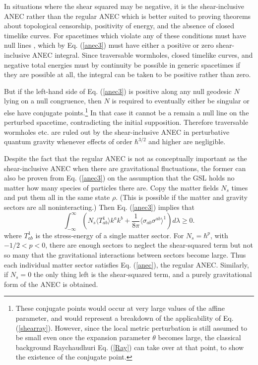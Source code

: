 \documentclass{article}
\begin{document}
In situations where the shear squared may be negative, it is the shear-inclusive ANEC rather than the regular ANEC which is better suited to proving theorems about topological censorship, positivity of energy, and the absence of closed timelike curves.  For spacetimes which violate any of these conditions must have null lines \cite{GO07}\cite{PSW93}, which by Eq. (\ref{anec3}) must have either a positive or zero shear-inclusive ANEC integral.  Since traversable wormholes, closed timelike curves, and negative total energies must by continuity be possible in generic spacetimes if they are possible at all, the integral can be taken to be positive rather than zero.

But if the left-hand side of Eq. (\ref{anec3}) is positive along any null geodesic $N$ lying on a null congruence, then $N$ is required to eventually either be singular or else have conjugate points.\footnote{These conjugate points would occur at very large values of the affine parameter, and would represent a breakdown of the applicability of Eq. (\ref{shearray}).  However, since the local metric perturbation is still assumed to be small even once the expansion parameter $\theta$ becomes large, the classical background Raychaudhuri Eq. (\ref{Ray}) can take over at that point, to show the existence of the conjugate point.}  In that case it cannot be a remain a null line on the perturbed spacetime, contradicting the initial supposition.  Therefore traversable wormholes etc. are ruled out by the shear-inclusive ANEC in perturbative quantum gravity whenever effects of order $\hbar^{3/2}$ and higher are negligible.

Despite the fact that the regular ANEC is not as conceptually important as the shear-inclusive ANEC when there are gravitational fluctuations, the former can also be proven from Eq. (\ref{anec3}) on the assumption that the GSL holds no matter how many species of particles there are.  Copy the matter fields $N_s$ times and put them all in the same state $\rho$.  (This is possible if the matter and gravity sectors are all noninteracting.)  Then Eq. (\ref{anec3}) implies that 
\begin{equation}
\int^{\infty}_{-\infty} (N_s \langle T_{ab}^{1} \rangle k^a k^b + 
\frac{1}{8\pi} \langle \sigma_{ab}\sigma^{ab} \rangle^{1}) d\lambda \ge 0.
\end{equation}
where $T_{ab}^{1}$ is the stress-energy of a single matter sector.  For $N_s = \hbar^{p}$, with $-1/2 < p < 0$, there are enough sectors to neglect the shear-squared term but not so many that the gravitational interactions between sectors become large.  Thus each individual matter sector satisfies Eq. (\ref{anec}), the regular ANEC.  Similarly, if $N_s = 0$ the only thing left is the shear-squared term, and a purely gravitational form of the ANEC is obtained.
\end{document}
